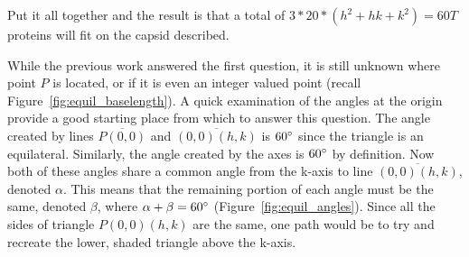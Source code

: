 \documentclass[12pt,letter]{article}
\begin{document}
Put it all together and the result is that a total of $3*20*(h^2 + hk + k^2) = 60 T$ proteins will fit on the capsid described.

While the previous work answered the first question, it is still unknown where point $P$ is located, or if it is even an integer valued point (recall Figure~\ref{fig:equil_baselength}). A quick examination of the angles at the origin provide a good starting place from which to answer this question. The angle created by lines $\overline{P(0,0)}$ and $\overline{(0,0)(h,k)}$ is $60\degree$ since the triangle is an equilateral. Similarly, the angle created by the axes is $60\degree$ by definition. Now both of these angles share a common angle from the k-axis to line $\overline{(0,0)(h,k)}$, denoted $\alpha$. This means that the remaining portion of each angle must be the same, denoted $\beta$, where $\alpha + \beta = 60\degree$ (Figure~\ref{fig:equil_angles}). Since all the sides of triangle $P(0,0)(h,k)$ are the same, one path would be to try and recreate the lower, shaded triangle above the k-axis.
\end{document}
